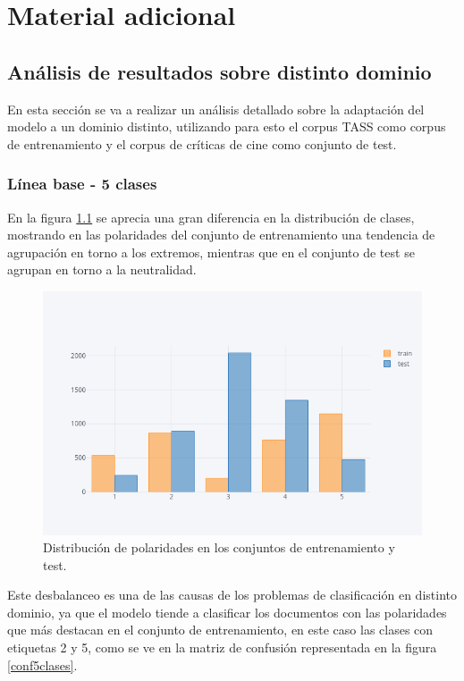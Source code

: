 \chapter{Material adicional}
\label{chap:adicional}

\section {Análisis de resultados sobre distinto dominio}

En esta sección se va a realizar un análisis detallado sobre la adaptación del modelo a un dominio distinto, utilizando para esto el corpus TASS como corpus de entrenamiento y el corpus de críticas de cine como conjunto de test.

\subsection{Línea base - 5 clases}\label{analisis_bl_5}

En la figura \ref{distTassCine} se aprecia una gran diferencia en la distribución de clases, mostrando en las polaridades del conjunto de entrenamiento una tendencia de agrupación en torno a los extremos, mientras que en el conjunto de test se agrupan en torno a la neutralidad. 

\begin{figure}[H]
	\centering
	\includegraphics[width=1\textwidth]{imaxes/distCineTass.png}
	\caption{Distribución de polaridades en los conjuntos de entrenamiento y test.}
	\label{distTassCine}
\end{figure}

Este desbalanceo es una de las causas de los problemas de clasificación en distinto dominio, ya que el modelo tiende a clasificar los documentos con las polaridades que más destacan en el conjunto de entrenamiento, en este caso las clases con etiquetas 2 y 5, como se ve en la matriz de confusión representada en la figura \ref{conf5clases}.



